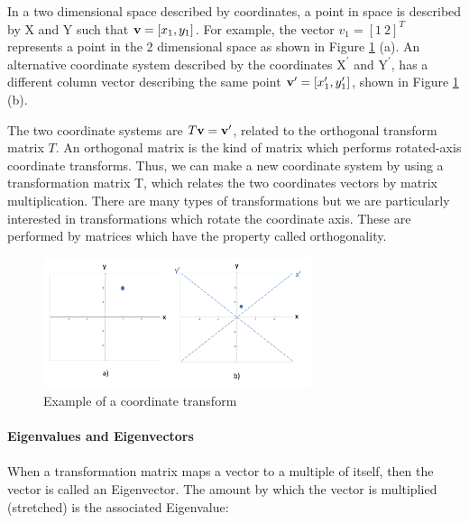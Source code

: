 \documentclass[11pt, oneside]{article}   	%
\begin{document}
In a two dimensional space described by coordinates, a point in space is described by X and Y such that ${\bf v} = [x_1, y_1]$. For example, the vector $v_1 = [1 ~2]^T$ represents a point in the 2 dimensional space as shown in Figure \ref{fig:CoordinateTransform} (a).
An alternative coordinate system described by the coordinates $\text{X}^\prime$ and $\text{Y}^\prime$, has a different column vector describing the same point ${\bf v^\prime} = [x_1^\prime, y_1^\prime]$, shown in Figure \ref{fig:CoordinateTransform} (b).

The two coordinate systems are $T{\bf v} = {\bf v}^\prime$, related to the orthogonal transform matrix $T$. An orthogonal matrix is the kind of matrix which performs rotated-axis coordinate transforms. Thus, we can make a new coordinate system by using a transformation matrix T, which relates the two coordinates vectors by matrix multiplication. There are many types of transformations but we are particularly interested in transformations which rotate the coordinate axis. These are performed by matrices which have the property called orthogonality.

\begin{figure}[!ht]
	\centering
	\includegraphics[width=0.7\textwidth]{example-coordinate-transform}
	\caption{Example of a coordinate transform}
	\label{fig:CoordinateTransform}
\end{figure}



\paragraph{Eigenvalues and Eigenvectors}
\paragraph{}

When a transformation matrix maps a vector to a multiple of itself, then the vector is called an Eigenvector. The amount by which the vector is multiplied (stretched) is the associated Eigenvalue:
\end{document}
